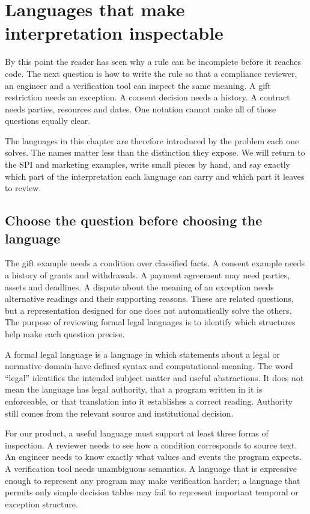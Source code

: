 \chapter{Languages that make interpretation inspectable}
\label{ch:languages}

By this point the reader has seen why a rule can be incomplete before it reaches
code. The next question is how to write the rule so that a compliance reviewer,
an engineer and a verification tool can inspect the same meaning. A gift
restriction needs an exception. A consent decision needs a history. A contract
needs parties, resources and dates. One notation cannot make all of those
questions equally clear.

The languages in this chapter are therefore introduced by the problem each one
solves. The names matter less than the distinction they expose. We will return
to the SPI and marketing examples, write small pieces by hand, and say exactly
which part of the interpretation each language can carry and which part it
leaves to review.


\section{Choose the question before choosing the language}
\label{merge:M04:00}

\label{sec:languages-question}
The gift example needs a condition over classified facts. A consent example
needs a history of grants and withdrawals. A payment agreement may need parties,
assets and deadlines. A dispute about the meaning of an exception needs
alternative readings and their supporting reasons. These are related questions,
but a representation designed for one does not automatically solve the others.
The purpose of reviewing formal legal languages is to identify which structures
help make each question precise.

A formal legal language is a language in which statements about a legal or
normative domain have defined syntax and computational meaning. The word
``legal'' identifies the intended subject matter and useful abstractions. It
does not mean the language has legal authority, that a program written in it
is enforceable, or that translation into it establishes a correct reading.
Authority still comes from the relevant source and institutional decision.


For our product, a useful language must support at least three forms of
inspection. A reviewer needs to see how a condition corresponds to source
text. An engineer needs to know exactly what values and events the program
expects. A verification tool needs unambiguous semantics. A language that is
expressive enough to represent any program may make verification harder; a
language that permits only simple decision tables may fail to represent
important temporal or exception structure.


